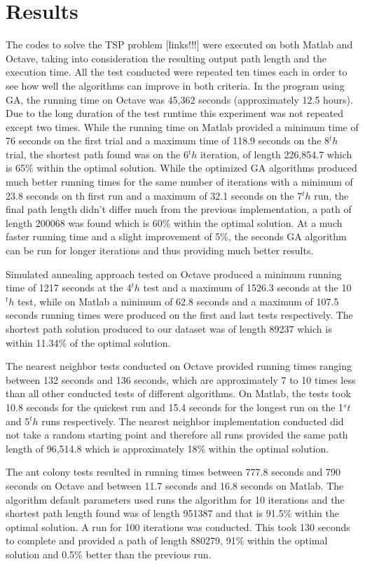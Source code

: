 \documentclass[twocolumn]{article}
\begin{document}
	\section{Results}
	The codes to solve the TSP problem [links!!!] were executed on both Matlab and Octave, taking into consideration the resulting output path length and the execution time. All the test conducted were repeated ten times each in order to see how well the algorithms can improve in both criteria. In the program using GA, the running time on Octave was 45,362 seconds (approximately 12.5 hours). Due to the long duration of the test runtime this experiment was not repeated except two times. While the running time on Matlab provided a minimum time of 76 seconds on the first trial and a maximum time of 118.9 seconds on the 8$^th$ trial, the shortest path found was on the 6$^th$ iteration, of length 226,854.7 which is 65\% within the optimal solution. While the optimized GA algorithms produced much better running times for the same number of iterations with a minimum of 23.8 seconds on th first run and a maximum of 32.1 seconds on the 7$^th$ run, the final path length didn't differ much from the previous implementation, a path of length 200068 was found which is 60\% within the optimal solution. At a much faster running time and a slight improvement of 5\%, the seconds GA algorithm can be run for longer iterations and thus providing much better results.
	
	Simulated annealing approach tested on Octave produced a minimum running time of 1217 seconds at the 4$^th$ test and a maximum of 1526.3 seconds at the 10$^th$ test, while on Matlab a minimum of 62.8 seconds and a maximum of 107.5 seconds running times were produced on the first and last tests respectively. The shortest path solution produced to our dataset was of length 89237 which is within 11.34\% of the optimal solution.
	
	The nearest neighbor tests conducted on Octave provided running times ranging between 132 seconds and 136 seconds, which are approximately 7 to 10 times less than all other conducted tests of different algorithms. On Matlab, the tests took 10.8 seconds for the quickest run and 15.4 seconds for the longest run on the 1$^st$ and 5$^th$ runs respectively. The nearest neighbor implementation conducted did not take a random starting point and therefore all runs provided the same path length of 96,514.8 which is approximately 18\%  within the optimal solution.
	
	The ant colony tests resulted in running times between 777.8 seconds and 790 seconds on Octave and between 11.7 seconds and 16.8 seconds on Matlab. The algorithm default parameters used runs the algorithm for 10 iterations and the shortest path length found was of length 951387 and that is 91.5\% within the optimal solution. A run for 100 iterations was conducted. This took 130 seconds to complete and provided a path of length 880279, 91\% within the optimal solution and 0.5\% better than the previous run.
	
\end{document}
